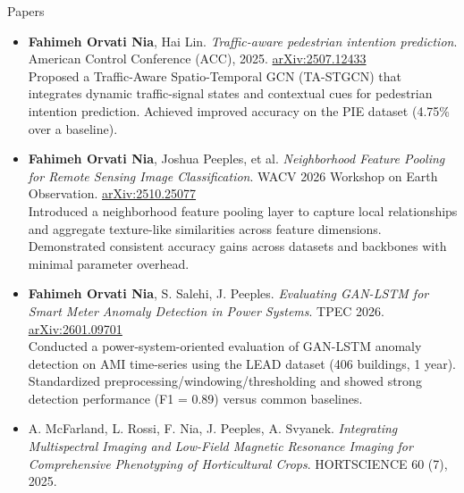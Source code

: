 \documentclass{resume} %
\begin{document}
\begin{rSection}{Papers}
\begin{itemize}
  \item {\bf Fahimeh Orvati Nia}, Hai Lin. \textit{Traffic-aware pedestrian intention prediction}. American Control Conference (ACC), 2025. \href{https://arxiv.org/abs/2507.12433}{arXiv:2507.12433}\\
  {\small Proposed a Traffic-Aware Spatio-Temporal GCN (TA-STGCN) that integrates dynamic traffic-signal states and contextual cues for pedestrian intention prediction. Achieved improved accuracy on the PIE dataset (4.75\% over a baseline).}
  \item {\bf Fahimeh Orvati Nia}, Joshua Peeples, et al. \textit{Neighborhood Feature Pooling for Remote Sensing Image Classification}. WACV 2026 Workshop on Earth Observation. \href{https://arxiv.org/abs/2510.25077}{arXiv:2510.25077}\\
  {\small Introduced a neighborhood feature pooling layer to capture local relationships and aggregate texture-like similarities across feature dimensions. Demonstrated consistent accuracy gains across datasets and backbones with minimal parameter overhead.}
  \item {\bf Fahimeh Orvati Nia}, S. Salehi, J. Peeples. \textit{Evaluating GAN-LSTM for Smart Meter Anomaly Detection in Power Systems}. TPEC 2026. \href{https://arxiv.org/abs/2601.09701}{arXiv:2601.09701}\\
  {\small Conducted a power-system-oriented evaluation of GAN-LSTM anomaly detection on AMI time-series using the LEAD dataset (406 buildings, 1 year). Standardized preprocessing/windowing/thresholding and showed strong detection performance (F1 = 0.89) versus common baselines.}
  \item A. McFarland, L. Rossi, F. Nia, J. Peeples, A. Svyanek. \textit{Integrating Multispectral Imaging and Low-Field Magnetic Resonance Imaging for Comprehensive Phenotyping of Horticultural Crops}. HORTSCIENCE 60 (7), 2025.
\end{itemize}
\end{rSection}
\end{document}
